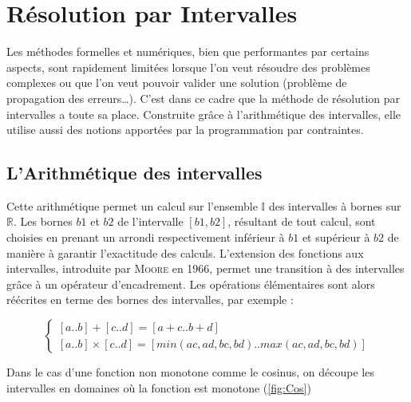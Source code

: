 \section{Résolution par Intervalles}
Les méthodes formelles et numériques, bien que performantes par certains aspects, sont rapidement limitées lorsque l'on veut résoudre des problèmes complexes ou que l'on veut pouvoir valider une solution (problème de propagation des erreurs\dots). C'est dans ce cadre que la méthode de résolution par intervalles a toute sa place. Construite grâce à l'arithmétique des intervalles, elle utilise aussi des notions apportées par la programmation par contraintes.
 
\subsection{L'Arithmétique des intervalles}
Cette arithmétique permet un calcul sur l'ensemble $\mathbb{I}$ des intervalles à bornes sur $\mathbb{R}$. Les bornes $b1$ et $b2$ de l'intervalle $[b1,b2]$, résultant de tout calcul, sont choisies en prenant un arrondi respectivement inférieur à $b1$ et supérieur à $b2$ de manière à garantir l'exactitude des calculs. L'extension des fonctions aux intervalles, introduite par \textsc{Moore} en 1966, permet une transition à des intervalles grâce à un opérateur d'encadrement. Les opérations élémentaires sont alors réécrites en terme des bornes des intervalles, par exemple : 

\begin{equation}\label{eq2}
\begin{cases}
[a .. b] + [c .. d] = [a + c .. b + d] \\
[a .. b] × [c .. d] = [min(ac, ad, bc, bd) .. max(ac, ad, bc, bd)]
\end{cases}
\end{equation}

Dans le cas d’une fonction non monotone comme le cosinus, on découpe les intervalles en domaines où la fonction est monotone  (\ref{fig:Cos})

